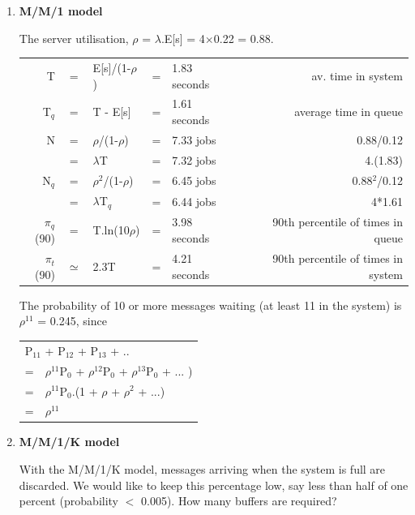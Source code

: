 \documentclass[12pt,fleqn]{report}
\begin{document}
\begin{enumerate}


\item {\bf M/M/1 model}

The server utilisation, $\rho$ = $\lambda$.E[s] = 4$\times$0.22 =
 0.88.

\begin{tabular}{ r c l c l r}
T     & = & E[s]/(1-$\rho$) & = & 1.83 seconds & av. time in system   \\
T$_q$ & = & T - E[s]        & = & 1.61 seconds & average time in queue\\
N     & = & $\rho$/(1-$\rho$) & = & 7.33 jobs       & 0.88/0.12        \\
      & = & $\lambda$T        & = & 7.32 jobs      & 4.(1.83)          \\
N$_q$ & = & $\rho^2$/(1-$\rho$) & = & 6.45 jobs     & 0.88$^2$/0.12    \\      
      & = & $\lambda$T$_q$      & = & 6.44 jobs      & 4*1.61          \\
$\pi_q$(90) & = & T.ln(10$\rho$) & = & 3.98 seconds & 90th percentile of times in queue \\
$\pi_t$(90) & $\simeq$ & 2.3T    & = & 4.21 seconds & 90th percentile of times in system \\
\end{tabular}

The probability of 10 or more messages waiting 
(at least 11 in the system) is $\rho^{11}$ = 0.245, since

\begin{center}
\begin{tabular}{c l}
\multicolumn{2}{l}{P$_{11}$ + P$_{12}$ + P$_{13}$ + ..}\\
  = & $\rho^{11}$P$_0$ + $\rho^{12}$P$_0$ + $\rho^{13}$P$_0$ + ... )\\
  = & $\rho^{11}$P$_0$.(1 + $\rho$ + $\rho^{2}$ + ...)\\
  = & $\rho^{11}$\\
\end{tabular}
\end{center}

   



\item {\bf M/M/1/K model}

With the M/M/1/K model, messages arriving when the system is full are
discarded.
We would like to keep this percentage low, say less than half of
one percent (probability $<$ 0.005).
How many buffers are required?


\end{enumerate}
\end{document}

